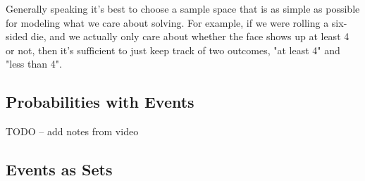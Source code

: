 \documentclass[6008notes.tex]{subfiles}
\begin{document}
Generally speaking it's best to choose a sample space that is as simple as possible for modeling what we care about solving. For example, if we were rolling a six-sided die, and we actually only care about whether the face shows up at least 4 or not, then it's sufficient to just keep track of two outcomes, "at least 4" and "less than 4".

\subsection{Probabilities with Events}

TODO -- add notes from video



\subsection{Events as Sets}
\end{document}

